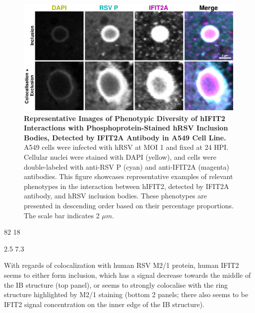 \begin{figure}
    \centering
    \includegraphics[width=1\linewidth]{08. Chapter 3/Figs/02. Infection/02. IFIT2/01. IFIT2A/06. i2a a549 hrsv p.pdf} 
    \caption[Representative Images of Phenotypic Diversity of hIFIT2 Interactions with Phosphoprotein-Stained hRSV Inclusion Bodies, Detected by IFIT2A Antibody in A549 Cell Line.]{\textbf{Representative Images of Phenotypic Diversity of hIFIT2 Interactions with Phosphoprotein-Stained hRSV Inclusion Bodies, Detected by IFIT2A Antibody in A549 Cell Line.} A549 cells were infected with hRSV at MOI 1 and fixed at 24 HPI. Cellular nuclei were stained with DAPI (yellow), and cells were double-labeled with anti-RSV P (cyan) and anti-IFIT2A (magenta) antibodies. This figure showcases representative examples of relevant phenotypes in the interaction between hIFIT2, detected by IFIT2A antibody, and hRSV inclusion bodies. These phenotypes are presented in descending order based on their percentage proportions. The scale bar indicates 2 \(\mu m\).}
    \label{fig:Representative Images of Phenotypic Diversity of hIFIT2 Interactions with Phosphoprotein-Stained hRSV Inclusion Bodies, Detected by IFIT2A Antibody in A549 Cell Line}
\end{figure}

82 18

2.5 7.3

With regards of colocalization with human RSV M2/1 protein, human IFIT2 seems to either form inclusion, which has a signal decrease towards the middle of the IB structure (top panel), or seems to strongly colocalise with the ring structure highlighted by M2/1 staining (bottom 2 panels; there also seems to be IFIT2 signal concentration on the inner edge of the IB structure).

